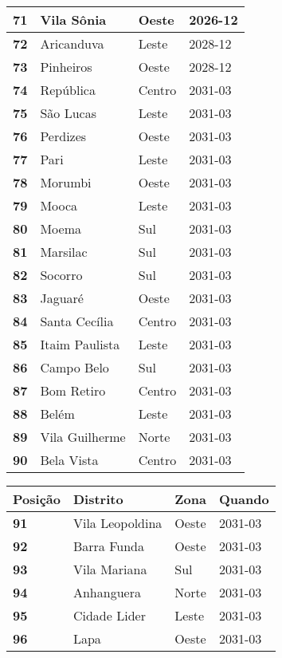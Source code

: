 \begin{table}[H]
\begin{tabular}{l|l|l|l}
		\textbf{71} & Vila Sônia & Oeste & 2026-12\\ \hline
		\textbf{72} & Aricanduva & Leste & 2028-12\\ \hline
		\textbf{73} & Pinheiros & Oeste & 2028-12\\ \hline
		\textbf{74} & República & Centro & 2031-03\\ \hline
		\textbf{75} & São Lucas & Leste & 2031-03\\ \hline
		\textbf{76} & Perdizes & Oeste & 2031-03\\ \hline
		\textbf{77} & Pari & Leste & 2031-03\\ \hline
		\textbf{78} & Morumbi & Oeste & 2031-03\\ \hline
		\textbf{79} & Mooca & Leste & 2031-03\\ \hline
		\textbf{80} & Moema & Sul & 2031-03\\ \hline
		\textbf{81} & Marsilac & Sul & 2031-03\\ \hline
		\textbf{82} & Socorro & Sul & 2031-03\\ \hline
		\textbf{83} & Jaguaré & Oeste & 2031-03\\ \hline
		\textbf{84} & Santa Cecília & Centro & 2031-03\\ \hline
		\textbf{85} & Itaim Paulista & Leste & 2031-03\\ \hline
		\textbf{86} & Campo Belo & Sul & 2031-03\\ \hline
		\textbf{87} & Bom Retiro & Centro & 2031-03\\ \hline
		\textbf{88} & Belém & Leste & 2031-03\\ \hline
		\textbf{89} & Vila Guilherme & Norte & 2031-03\\ \hline
		\textbf{90} & Bela Vista & Centro & 2031-03\\ 	
	\end{tabular}
\end{table}

\begin{table}[H]
	\centering
	\begin{tabular}{l|l|l|l}
	\textbf{Posição} & \textbf{Distrito} & \textbf{Zona} & \textbf{Quando} \\ \hline
	\textbf{91} & Vila Leopoldina & Oeste & 2031-03\\ \hline
	\textbf{92} & Barra Funda & Oeste & 2031-03\\ \hline
	\textbf{93} & Vila Mariana & Sul & 2031-03\\ \hline
	\textbf{94} & Anhanguera & Norte & 2031-03\\ \hline
	\textbf{95} & Cidade Lider & Leste & 2031-03\\ \hline
	\textbf{96} & Lapa & Oeste & 2031-03\\	
	\end{tabular}
\end{table}

